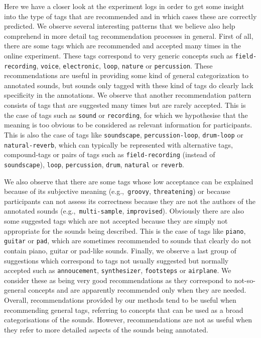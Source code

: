 Here we have a closer look at the experiment logs in order to get some insight into the type of tags that are recommended and in which cases these are correctly predicted. We observe several interesting patterns that we believe also help comprehend in more detail tag recommendation processes in general. First of all, there are some tags which are recommended and accepted many times in the online experiment. These tags correspond to very generic concepts such as \texttt{field-recording}, \texttt{voice}, \texttt{electronic}, \texttt{loop}, \texttt{nature} or \texttt{percussion}. These recommendations are useful in providing some kind of general categorization to annotated sounds, but sounds only tagged with these kind of tags do clearly lack specificity in the annotations. We observe that another recommendation pattern consists of tags that are suggested many times but are rarely accepted. This is the case of tags such as \texttt{sound} or \texttt{recording}, for which we hypothesise that the meaning is too obvious to be considered as relevant information for participants. This is also the case of tags like \texttt{soundscape}, \texttt{percussion-loop}, \texttt{drum-loop} or \texttt{natural-reverb}, which can typically be represented with alternative tags, compound-tags or pairs of tags such as \texttt{field-recording} (instead of \texttt{soundscape}), \texttt{loop}, \texttt{percussion}, \texttt{drum}, \texttt{natural} or \texttt{reverb}.

We also observe that there are some tags whose low acceptance can be explained because of its subjective meaning (e.g.,~\texttt{groovy}, \texttt{threatening}) or because participants can not assess its correctness because they are not the authors of the annotated sounds (e.g.,~\texttt{multi-sample}, \texttt{improvised}). Obviously there are also some suggested tags which are not accepted because they are simply not appropriate for the sounds being described. This is the case of tags like \texttt{piano}, \texttt{guitar} or \texttt{pad}, which are sometimes recommended to sounds that clearly do not contain piano, guitar or pad-like sounds. Finally, we observe a last group of suggestions which correspond to tags not usually suggested but normally accepted such as \texttt{annoucement}, \texttt{syn\-the\-sizer}, \texttt{footsteps} or \texttt{airplane}. We consider these as being very good recommendations as they correspond to not-so-general concepts and are apparently recommended only when they are needed. Overall, recommendations provided by our methods tend to be useful when recommending general tags, referring to concepts that can be used as a broad categorisations of the sounds. However, recommendations are not as useful when they refer to more detailed aspects of the sounds being annotated.


